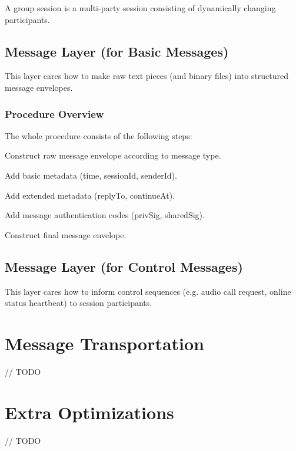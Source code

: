 \documentclass[a4paper,11pt]{article}
\begin{document}
A group session is a multi-party session consisting of dynamically changing participants.

\subsection{Message Layer (for Basic Messages)}

This layer cares how to make raw text pieces (and binary files) into structured message envelopes.

\subsubsection{Procedure Overview}

The whole procedure consists of the following steps:

\begin{compactitem}
    \item Construct raw message envelope according to message type.
    \item Add basic metadata (time, sessionId, senderId).
    \item Add extended metadata (replyTo, continueAt).
    \item Add message authentication codes (privSig, sharedSig).
    \item Construct final message envelope.
\end{compactitem}

\subsection{Message Layer (for Control Messages)}

This layer cares how to inform control sequences (e.g. audio call request, online status heartbeat) to session participants.








\section{Message Transportation}

// TODO










\section{Extra Optimizations}

// TODO
\end{document}
